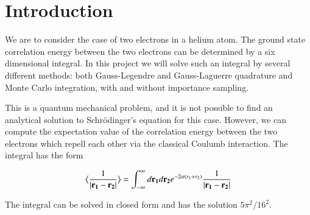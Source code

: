 \documentclass{aa}   %
\begin{document}
  


\section{Introduction}\label{sec:introduction}
We are to consider the case of two electrons in a helium atom. The ground state correlation energy between the two electrons can be determined by a six dimensional integral. In this project we will solve such an integral by several different methods: both Gauss-Legendre and Gauss-Laguerre quadrature and Monte Carlo integration, with and without importance sampling.

This is a quantum mechanical problem, and it is not possible to find an analytical solution to Schrödinger's equation for this case. However, we can compute the expectation value of the correlation energy between the two electrons which repell each other via the classical Coulumb interaction. The integral has the form

\begin{equation}
\big \langle \frac{1}{|\bf r_1 - r_2|} \big \rangle = \int_{-\infty}^{\infty}  d{\bf r_1}d{\bf r_2} e^{-2\alpha( r_1 + r_2)} \frac{1}{|\bf r_1 - r_2|}
\end{equation}

The integral can be solved in closed form and has the solution $5\pi^2 / 16^2$.
\end{document}
